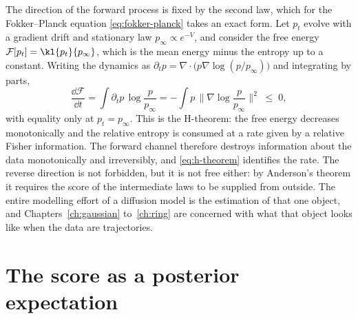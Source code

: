 The direction of the forward process is fixed by the second law, which for the
Fokker--Planck equation \eqref{eq:fokker-planck} takes an exact form. Let $p_t$
evolve with a gradient drift and stationary law $p_\infty \propto e^{-V}$, and
consider the free energy $\mathcal F[p_t] = \kl{p_t}{p_\infty}$, which is the
mean energy minus the entropy up to a constant. Writing the dynamics as
$\partial_t p = \nabla \cdot \big(p \nabla \log (p/p_\infty)\big)$ and
integrating by parts,
\begin{equation}
  \frac{\dd \mathcal F}{\dd t}
  = \int \partial_t p \, \log \frac{p}{p_\infty}
  = -\int p \,\Big\| \nabla \log \frac{p}{p_\infty} \Big\|^2 \;\le\; 0 ,
  \label{eq:h-theorem}
\end{equation}
with equality only at $p_t = p_\infty$. This is the H-theorem: the free energy
decreases monotonically and the relative entropy is consumed at a rate given by
a relative Fisher information. The forward channel therefore destroys
information about the data monotonically and irreversibly, and
\eqref{eq:h-theorem} identifies the rate. The reverse direction is not
forbidden, but it is not free either: by Anderson's theorem it requires the
score of the intermediate laws to be supplied from outside. The entire
modelling effort of a diffusion model is the estimation of that one object, and
Chapters~\ref{ch:gaussian} to~\ref{ch:ring} are concerned with what that object
looks like when the data are trajectories.

\section{The score as a posterior expectation}\label{sec:tweedie}

